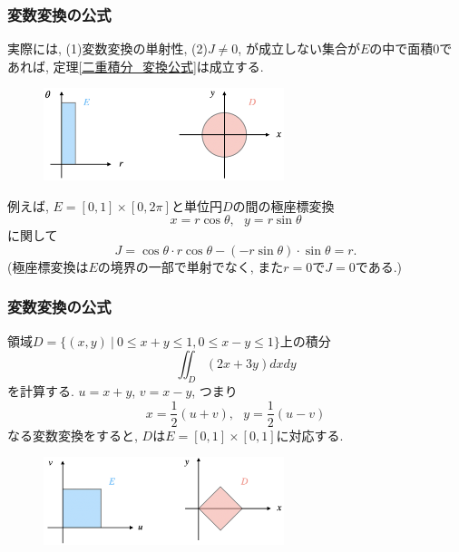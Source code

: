 \begin{frame}
\frametitle{変数変換の公式}

 
実際には, (1)変数変換の単射性, (2)$J\ne 0$, が成立しない集合が$E$の中で面積$0$であれば, 定理\ref{二重積分_変換公式}は成立する. 

\begin{figure}[htbp]
 \begin{center} 
  \includegraphics[width=70mm]{calculus13/polar_coord.png}
 \end{center}
\end{figure}
\vspace{-2mm}

例えば, $E=[0,1]\times [0,2\pi]$と単位円$D$の間の極座標変換
$$
x=r\cos \theta, \ \ \ y=r \sin \theta
$$
に関して
$$
J= \cos \theta \cdot r \cos \theta-(-r\sin \theta)\cdot \sin \theta = r. 
$$
(極座標変換は$E$の境界の一部で単射でなく, また$r=0$で$J=0$である.)

\end{frame}





\begin{frame}
\frametitle{変数変換の公式}

領域$D=\{(x,y) \ | \ 0 \le x+y \le 1, 0 \le x-y \le 1\}$上の積分
$$
\iint_D (2x+3y)dxdy
$$
を計算する. $u=x+y$, $v=x-y$, つまり
$$
x=\frac{1}{2}(u+v), \ \ \ y=\frac{1}{2}(u-v)
$$
なる変数変換をすると, $D$は$E=[0,1] \times [0,1]$に対応する. 
\vspace{-2mm}
\begin{figure}[htbp]
 \begin{center} 
  \includegraphics[width=70mm]{calculus13/var_change.png}
 \end{center}
\end{figure}
\vspace{-2mm}

\end{frame}


